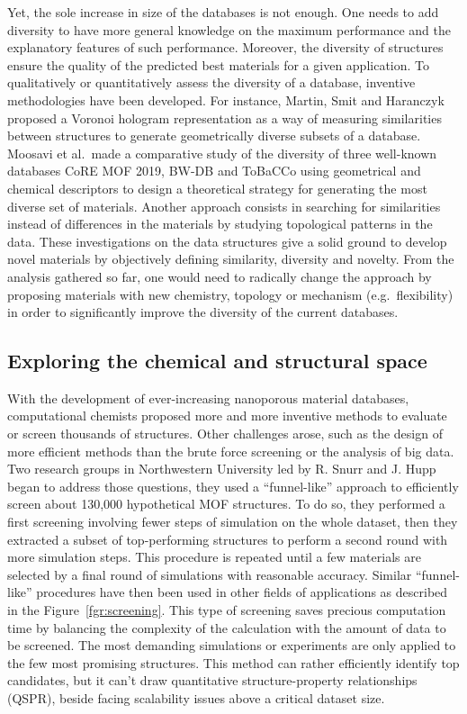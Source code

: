 \documentclass[main.tex]{subfiles}
\begin{document}
Yet, the sole increase in size of the databases is not enough. One needs to add diversity to have more general knowledge on the maximum performance and the explanatory features of such performance. Moreover, the diversity of structures ensure the quality of the predicted best materials for a given application. To qualitatively or quantitatively assess the diversity of a database, inventive methodologies have been developed. For instance, Martin, Smit and Haranczyk proposed a Voronoi hologram representation as a way of measuring similarities between structures to generate geometrically diverse subsets of a database.\autocite{Martin_2011} Moosavi et al.\ made a comparative study of the diversity of three well-known databases CoRE MOF 2019,\autocite{Chung_2019} BW-DB\autocite{Boyd_2016} and ToBaCCo\autocite{Gomez_Gualdron_2016, Colon_2017}  using geometrical and chemical descriptors to design a theoretical strategy for generating the most diverse set of materials.\autocite{Moosavi_2020} Another approach consists in searching for similarities instead of differences in the materials by studying topological patterns in the data.\autocite{Lee_2017} These investigations on the data structures give a solid ground to develop novel materials by objectively defining similarity, diversity and novelty. From the analysis gathered so far, one would need to radically change the approach by proposing materials with new chemistry, topology or mechanism (e.g.\ flexibility) in order to significantly improve the diversity of the current databases.


\subsection{Exploring the chemical and structural space}


With the development of ever-increasing nanoporous material databases, computational chemists proposed more and more inventive methods to evaluate or screen thousands of structures. Other challenges arose, such as the design of more efficient methods than the brute force screening or the analysis of big data. Two research groups in Northwestern University led by R. Snurr and J. Hupp began to address those questions, they used a ``funnel-like'' approach to efficiently screen about 130,000 hypothetical MOF structures.\autocite{Wilmer_2012} To do so, they performed a first screening involving fewer steps of simulation on the whole dataset, then they extracted a subset of top-performing structures to perform a second round with more simulation steps. This procedure is repeated until a few materials are selected by a final round of simulations with reasonable accuracy. Similar ``funnel-like'' procedures have then been used in other fields of applications as described in the Figure~\ref{fgr:screening}. This type of screening saves precious computation time by balancing the complexity of the calculation with the amount of data to be screened. The most demanding simulations or experiments are only applied to the few most promising structures. This method can rather efficiently identify top candidates, but it can't draw quantitative structure-property relationships (QSPR), beside facing scalability issues above a critical dataset size.
\end{document}
